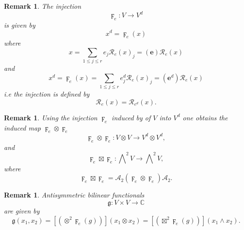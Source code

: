 \documentclass[aps,preprint]{revtex4}%
\newtheorem{remark}[theorem]{Remark}
\begin{document}
\begin{remark}
The injection
\begin{equation}
\digamma_{e}:V\rightarrow V^{d}%
\end{equation}
is given by
\begin{equation}
x^{d}=\digamma_{e}\left(  x\right)
\end{equation}
where
\begin{equation}
x=\sum_{1\leq j\leq r}e_{j}\mathcal{R}_{e}\left(  x\right)  _{j}=\left(
\mathbf{e}\right)  \mathcal{R}_{e}\left(  x\right)
\end{equation}
and
\begin{equation}
x^{d}=\digamma_{e}\left(  x\right)  =\sum_{1\leq j\leq r}e_{j}^{d}%
\mathcal{R}_{e}\left(  x\right)  _{j}=\left(  \mathbf{e}^{d}\right)
\mathcal{R}_{e}\left(  x\right)
\end{equation}
i.e the injection is defined by
\begin{equation}
\mathcal{R}_{e}\left(  x\right)  =\mathcal{R}_{e^{d}}\left(  x\right)  .
\end{equation}

\end{remark}

\begin{remark}
Using the injection $\digamma_{e}$ induced by of $V$ into $V^{d}$ one obtains
the induced map $\digamma_{e}\otimes\digamma_{e}$
\begin{equation}
\digamma_{e}\otimes\digamma_{e}:V\otimes V\rightarrow V^{d}\otimes V^{d},
\end{equation}
and%
\begin{equation}
\digamma_{e}\boxtimes\digamma_{e}:\bigwedge\nolimits^{2}V\rightarrow
\bigwedge\nolimits^{2}V,
\end{equation}
where%
\begin{equation}
\digamma_{e}\boxtimes\digamma_{e}=\mathcal{A}_{2}\left(  \digamma_{e}%
\otimes\digamma_{e}\right)  \mathcal{A}_{2}.
\end{equation}

\end{remark}

\begin{remark}
Antisymmetric bilinear functionals%
\begin{equation}
\mathfrak{g}:V\times V\rightarrow\mathbb{C}%
\end{equation}
are given by%
\begin{equation}
\mathfrak{g}\left(  x_{1},x_{2}\right)  =\left[  \left(  \otimes^{2}%
\digamma_{e}\left(  g\right)  \right)  \right]  \left(  x_{1}\otimes
x_{2}\right)  =\left[  \left(  \boxtimes^{2}\digamma_{e}\left(  g\right)
\right)  \right]  \left(  x_{1}\wedge x_{2}\right)  .
\end{equation}

\end{remark}
\end{document}
